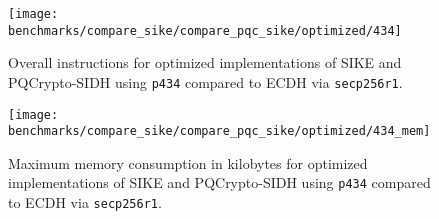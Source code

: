 \begin{figure}[H]
  \centering
  \texttt{[image: benchmarks/compare\_sike/compare\_pqc\_sike/optimized/434]}
  \caption[Instructions of optimized \gls{SIKE} and \gls{PQCrypto-SIDH} implementations]
  {Overall instructions for optimized implementations of \gls{SIKE} and \gls{PQCrypto-SIDH} using \texttt{p434} compared to \gls{ECDH} via \texttt{secp256r1}.}
  \label{fig:results_sike_pqc_opt_434}
\end{figure}

\begin{figure}[H]
  \centering
  \texttt{[image: benchmarks/compare\_sike/compare\_pqc\_sike/optimized/434\_mem]}
  \caption[Memory consumption of optimized \gls{SIKE} and \gls{PQCrypto-SIDH} implementations]
  {Maximum memory consumption in kilobytes for optimized implementations of \gls{SIKE} and \gls{PQCrypto-SIDH} using \texttt{p434} compared to \gls{ECDH} via \texttt{secp256r1}.}
  \label{fig:results_sike_pqc_opt_434_mem}
\end{figure}

